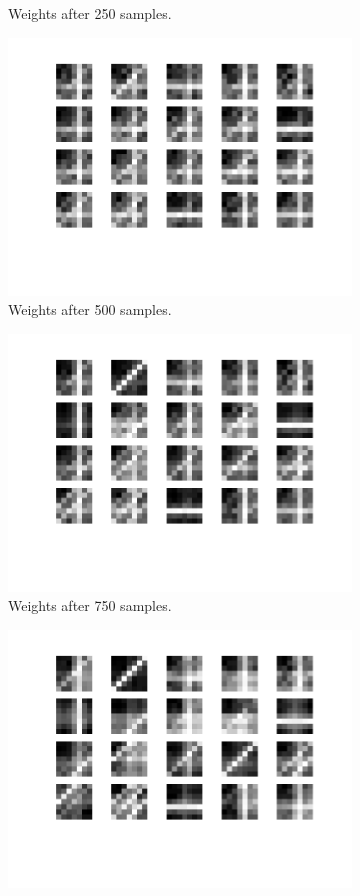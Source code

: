 \begin{figure}[h!]
\begin{subfigure}[t]{.4\textwidth}
  		\caption{Weights after 250 samples.}
  		\label{fig:sub2}
	\end{subfigure}
	\begin{subfigure}[t]{.4\textwidth}
  		\centering
  		\includegraphics[width=.85\linewidth]{imgs/7x7/w3.png}
  		\caption{Weights after 500 samples.}
  		\label{fig:sub2}
	\end{subfigure}
	\begin{subfigure}[t]{.4\textwidth}
  		\centering
  		\includegraphics[width=.85\linewidth]{imgs/7x7/w4.png}
  		\caption{Weights after 750 samples.}
  		\label{fig:sub2}
	\end{subfigure}
	\begin{subfigure}[t]{.4\textwidth}
  		\centering
  		\includegraphics[width=.85\linewidth]{imgs/7x7/w5.png}

\end{subfigure}
\end{figure}
